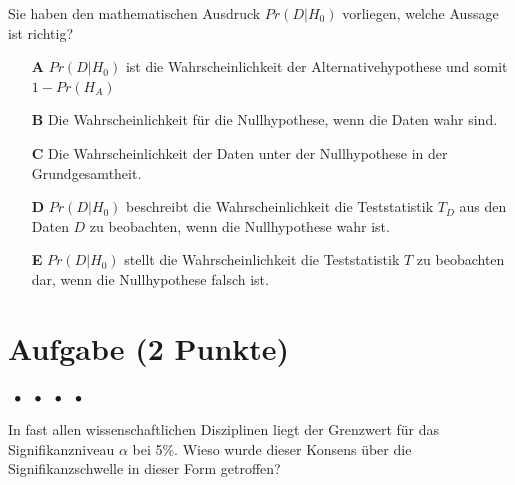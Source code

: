 \documentclass[a4paper, 9pt]{scrartcl}\usepackage[]{graphicx}\usepackage[]{xcolor}
\begin{document}
Sie haben den mathematischen Ausdruck $Pr(D|H_0)$ vorliegen, welche Aussage ist richtig?



\begin{enumerate}
\item [\textbf{A} \msquare] $Pr(D|H_0)$ ist die Wahrscheinlichkeit der Alternativehypothese und somit $1 - Pr(H_A)$
\item [\textbf{B} \msquare] Die Wahrscheinlichkeit für die Nullhypothese, wenn die Daten wahr sind.
\item [\textbf{C} \msquare] Die Wahrscheinlichkeit der Daten unter der Nullhypothese in der Grundgesamtheit.
\item [\textbf{D} \msquare] $Pr(D|H_0)$ beschreibt die Wahrscheinlichkeit die Teststatistik $T_D$ aus den Daten $D$ zu beobachten, wenn die Nullhypothese wahr ist.
\item [\textbf{E} \msquare] $Pr(D|H_0)$ stellt die Wahrscheinlichkeit die Teststatistik $T$ zu beobachten dar, wenn die Nullhypothese falsch ist.
\end{enumerate} 

\section{Aufgabe \hfill (2 Punkte)}

\ifcollection
\begin{flushright}
\tiny\vspace{-2Ex}
\textbf{\examinhaltstart}
\exammodulemathstat $\;\bullet$
\exammodulestat $\;\bullet$
\exammodulestatbbv $\;\bullet$
\exammodulestatversuch $\;\bullet$
\exammodulebiostat
\vspace{-1Ex}
\end{flushright}
\fi




In fast allen wissenschaftlichen Disziplinen liegt der Grenzwert für das Signifikanzniveau $\alpha$ bei 5\%. Wieso wurde dieser Konsens über die Signifikanzschwelle in dieser Form getroffen?
\end{document}
